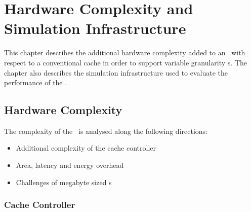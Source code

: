 
%
%

\chapter{Hardware Complexity and Simulation Infrastructure}
\label{chap:hardware_complexity_and_simulation}

This chapter describes the additional hardware complexity added to an \AC\ with respect to a conventional cache in order to support variable granularity \AB{}s. The chapter also describes the simulation infrastructure used to evaluate the performance of the \AC{}.

\section{Hardware Complexity}  
\label{sec:hardware_complexity}

The complexity of the \AC\ is analysed along the following directions:
\begin{itemize}
  \item Additional complexity of the cache controller
  \item Area, latency and energy overhead
  \item Challenges of megabyte sized \AC{}s
\end{itemize}


\subsection{Cache Controller} 

